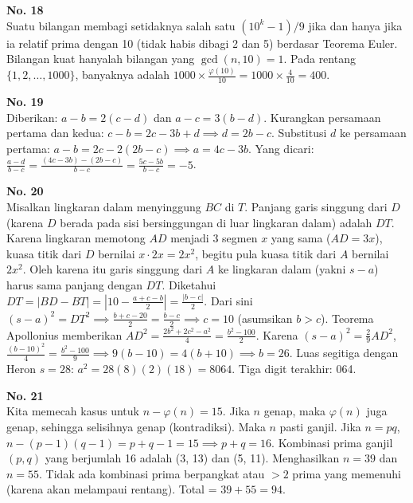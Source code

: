 \documentclass[11pt, a4paper]{article}
\begin{document}
\textbf{No. 18}\\
Suatu bilangan membagi setidaknya salah satu $(10^k-1)/9$ jika dan hanya jika ia relatif prima dengan 10 (tidak habis dibagi 2 dan 5) berdasar Teorema Euler. Bilangan kuat hanyalah bilangan yang $\gcd(n, 10) = 1$.
Pada rentang $\{1, 2, \dots, 1000\}$, banyaknya adalah $1000 \times \frac{\varphi(10)}{10} = 1000 \times \frac{4}{10} = 400$.

\textbf{No. 19}\\
Diberikan: $a-b = 2(c-d)$ dan $a-c = 3(b-d)$.
Kurangkan persamaan pertama dan kedua: $c - b = 2c - 3b + d \implies d = 2b - c$.
Substitusi $d$ ke persamaan pertama: $a - b = 2c - 2(2b - c) \implies a = 4c - 3b$.
Yang dicari: $\frac{a-d}{b-c} = \frac{(4c-3b) - (2b-c)}{b-c} = \frac{5c-5b}{b-c} = -5$.

\textbf{No. 20}\\
Misalkan lingkaran dalam menyinggung $BC$ di $T$. Panjang garis singgung dari $D$ (karena $D$ berada pada sisi bersinggungan di luar lingkaran dalam) adalah $DT$. Karena lingkaran memotong $AD$ menjadi 3 segmen $x$ yang sama ($AD = 3x$), kuasa titik dari $D$ bernilai $x \cdot 2x = 2x^2$, begitu pula kuasa titik dari $A$ bernilai $2x^2$. Oleh karena itu garis singgung dari $A$ ke lingkaran dalam (yakni $s-a$) harus sama panjang dengan $DT$.
Diketahui $DT = |BD - BT| = \left|10 - \frac{a+c-b}{2}\right| = \frac{|b-c|}{2}$.
Dari sini $(s-a)^2 = DT^2 \implies \frac{b+c-20}{2} = \frac{b-c}{2} \implies c = 10$ (asumsikan $b>c$).
Teorema Apollonius memberikan $AD^2 = \frac{2b^2 + 2c^2 - a^2}{4} = \frac{b^2 - 100}{2}$.
Karena $(s-a)^2 = \frac{2}{9} AD^2$, $\frac{(b-10)^2}{4} = \frac{b^2-100}{9} \implies 9(b-10) = 4(b+10) \implies b = 26$.
Luas segitiga dengan Heron $s = 28$: $a^2 = 28(8)(2)(18) = 8064$.
Tiga digit terakhir: 064.

\begin{center}
\end{center}

\textbf{No. 21}\\
Kita memecah kasus untuk $n-\varphi(n) = 15$. Jika $n$ genap, maka $\varphi(n)$ juga genap, sehingga selisihnya genap (kontradiksi). Maka $n$ pasti ganjil.
Jika $n = pq$, $n - (p-1)(q-1) = p + q - 1 = 15 \implies p + q = 16$.
Kombinasi prima ganjil $(p,q)$ yang berjumlah 16 adalah (3, 13) dan (5, 11).
Menghasilkan $n = 39$ dan $n = 55$. Tidak ada kombinasi prima berpangkat atau $>2$ prima yang memenuhi (karena akan melampaui rentang). Total = $39 + 55 = 94$.
\end{document}
